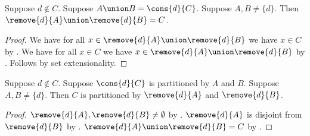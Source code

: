 \begin{proposition}\label{union_eq_cons_implies_union_remove_eq}
    Suppose $d\notin C$.
    Suppose $A\union B = \cons{d}{C}$.
    Suppose $A, B\neq \{d\}$.
    Then $\remove{d}{A}\union \remove{d}{B} = C$.
\end{proposition}
\begin{proof}
    We have for all $x\in \remove{d}{A}\union \remove{d}{B}$
        we have $x\in C$ by .
    We have for all $x\in C$
        we have $x\in \remove{d}{A}\union \remove{d}{B}$
        by .
    Follows by set extensionality.
\end{proof}

\begin{proposition}\label{bipartitions_cons}
    Suppose $d\notin C$.
    Suppose $\cons{d}{C}$ is partitioned by $A$ and $B$.
    Suppose $A, B\neq \{d\}$.
    Then $C$ is partitioned by $\remove{d}{A}$ and $\remove{d}{B}$.
\end{proposition}
\begin{proof}
    $\remove{d}{A},\remove{d}{B}\neq\emptyset$ by
        .
    $\remove{d}{A}$ is disjoint from $\remove{d}{B}$
        by .
    $\remove{d}{A}\union \remove{d}{B} = C$ by .
\end{proof}
